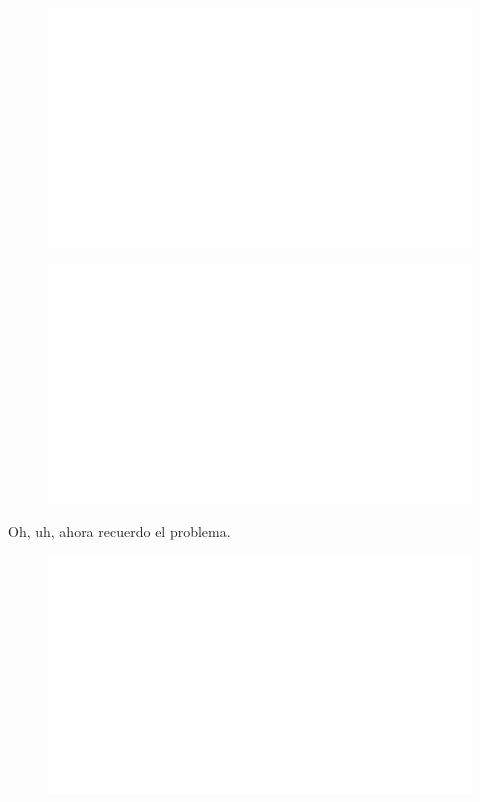 \begin{centering}
    \begin{figure}[h]
        \centering
        \includegraphics[width=\textwidth]{whyareyoucheckingthenameofthisfile.png}
    \end{figure}
\end{centering}

\begin{centering}
    \begin{figure}
        \centering
        \includegraphics[width=\textwidth]{whyareyoucheckingthenameofthisfile.png}
    \end{figure}
\end{centering}
\noindent


Oh, uh, ahora recuerdo el problema.

\begin{centering}
    \begin{figure}[h]
        \centering
        \includegraphics[width=\textwidth]{whyareyoucheckingthenameofthisfile.png}
    \end{figure}
\end{centering}

